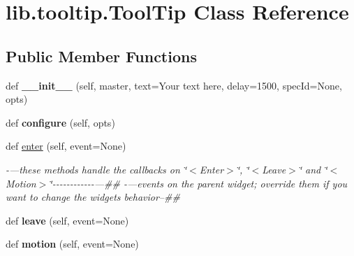 \hypertarget{classlib_1_1tooltip_1_1_tool_tip}{}\section{lib.\+tooltip.\+Tool\+Tip Class Reference}
\label{classlib_1_1tooltip_1_1_tool_tip}
\subsection*{Public Member Functions}
\begin{DoxyCompactItemize}
\item 
\mbox{\label{classlib_1_1tooltip_1_1_tool_tip_a19682c7c86f88447638a5de4e6b638c8}} 
def {\bfseries \+\_\+\+\_\+init\+\_\+\+\_\+} (self, master, text=\textquotesingle{}Your text here\textquotesingle{}, delay=1500, spec\+Id=None, opts)
\item 
\mbox{\label{classlib_1_1tooltip_1_1_tool_tip_a282ec8c5eabe3c7c0be194e8ddfff8a4}} 
def {\bfseries configure} (self, opts)
\item 
\mbox{\label{classlib_1_1tooltip_1_1_tool_tip_aa16e522c7a90db30a32e2cb39f58dad3}} 
def \hyperlink{classlib_1_1tooltip_1_1_tool_tip_aa16e522c7a90db30a32e2cb39f58dad3}{enter} (self, event=None)
\begin{DoxyCompactList}\small\item\em -\/---these methods handle the callbacks on \char`\"{}$<$\+Enter$>$\char`\"{}, \char`\"{}$<$\+Leave$>$\char`\"{} and \char`\"{}$<$\+Motion$>$\char`\"{}-\/-\/-\/-\/-\/-\/-\/-\/-\/-\/-\/-\/---\#\# -\/---events on the parent widget; override them if you want to change the widget\textquotesingle{}s behavior--\#\# \end{DoxyCompactList}\item 
\mbox{\label{classlib_1_1tooltip_1_1_tool_tip_aeb480a6915bed06ea71c8e3d3d1ee0d1}} 
def {\bfseries leave} (self, event=None)
\item 
\mbox{\label{classlib_1_1tooltip_1_1_tool_tip_a3a3f7510b7ce5729aa929211d18c93a7}} 
def {\bfseries motion} (self, event=None)
\item 
\mbox{\label{classlib_1_1tooltip_1_1_tool_tip_a7aac73112f2f5604e201434d80579314}} 

\end{DoxyCompactItemize}
